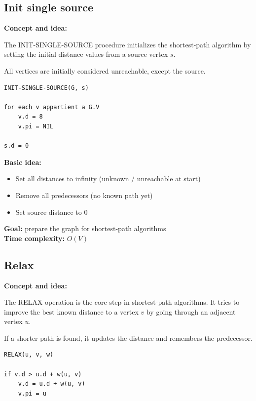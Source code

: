 \documentclass[11pt,a4paper,openany]{book}
\begin{document}
\subsection{Init single source}


\textbf{Concept and idea:}

The INIT-SINGLE-SOURCE procedure initializes the shortest-path algorithm by setting the initial distance values from a source vertex $s$.

All vertices are initially considered unreachable, except the source.

\begin{lstlisting}
INIT-SINGLE-SOURCE(G, s)

for each v appartient a G.V
    v.d = 8
    v.pi = NIL

s.d = 0
\end{lstlisting}

\textbf{Basic idea:}
\begin{itemize}
    \item Set all distances to infinity (unknown / unreachable at start)
    \item Remove all predecessors (no known path yet)
    \item Set source distance to 0
\end{itemize}

\textbf{Goal:} prepare the graph for shortest-path algorithms \\

\textbf{Time complexity:} $O(V)$






\vspace{2cm}





\subsection{Relax}


\textbf{Concept and idea:}

The RELAX operation is the core step in shortest-path algorithms. It tries to improve the best known distance to a vertex $v$ by going through an adjacent vertex $u$.

If a shorter path is found, it updates the distance and remembers the predecessor.

\begin{lstlisting}
RELAX(u, v, w)

if v.d > u.d + w(u, v)
    v.d = u.d + w(u, v)
    v.pi = u
\end{lstlisting}
\end{document}
